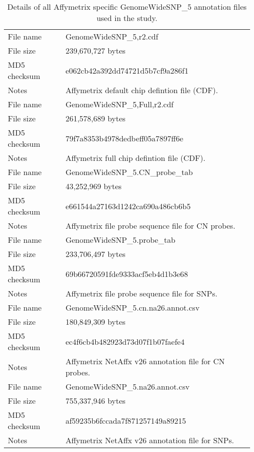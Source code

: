 \documentclass[10pt,a4paper]{article}
\begin{document}
\begin{table}[htp]
\begin{center}
\begin{tabular}{lp{}}
\hline
File name    & GenomeWideSNP\_5,r2.cdf \\
File size    & 239,670,727 bytes \\
MD5 checksum & e062cb42a392dd74721d5b7cf9a286f1 \\
Notes        & Affymetrix default chip defintion file (CDF). \\
\hline
File name    & GenomeWideSNP\_5,Full,r2.cdf \\
File size    & 261,578,689 bytes \\
MD5 checksum & 79f7a8353b4978dedbeff05a7897ff6e \\
Notes        & Affymetrix full chip defintion file (CDF). \\
\hline
File name    & GenomeWideSNP\_5.CN\_probe\_tab \\
File size    & 43,252,969 bytes \\
MD5 checksum & e661544a27163d1242ca690a486cb6b5 \\
Notes        & Affymetrix file probe sequence file for CN probes. \\
\hline
File name    & GenomeWideSNP\_5.probe\_tab \\
File size    & 233,706,497 bytes \\
MD5 checksum & 69b66720591fde9333acf5eb4d1b3e68 \\
Notes        & Affymetrix file probe sequence file for SNPs. \\
\hline
File name    & GenomeWideSNP\_5.cn.na26.annot.csv \\
File size    & 180,849,309 bytes \\
MD5 checksum & ec4f6cb4b482923d73d07f1b07faefe4 \\
Notes        & Affymetrix NetAffx v26 annotation file for CN probes. \\
\hline
File name    & GenomeWideSNP\_5.na26.annot.csv \\
File size    & 755,337,946 bytes \\
MD5 checksum & af59235b6fccada7f871257149a89215 \\
Notes        & Affymetrix NetAffx v26 annotation file for SNPs. \\
\hline
\end{tabular}
\end{center}
\caption{Details of all Affymetrix specific GenomeWideSNP\_5 annotation files used in the study.}
\label{tblGWSFiveAffymetrix}
\end{table}
\end{document}
